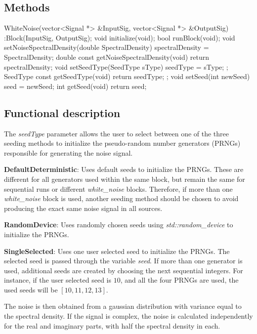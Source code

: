 \subsection*{Methods}

WhiteNoise(vector<Signal *> \&InputSig, vector<Signal *> \&OutputSig) :Block(InputSig, OutputSig){};
\bigbreak	
void initialize(void);
\bigbreak
bool runBlock(void);
\bigbreak
void setNoiseSpectralDensity(double SpectralDensity) { spectralDensity = SpectralDensity; }
\bigbreak
double const getNoiseSpectralDensity(void){ return spectralDensity; }
\bigbreak
void setSeedType(SeedType sType){ seedType = sType; };
\bigbreak
SeedType const getSeedType(void){ return seedType; };
\bigbreak
void setSeed(int newSeed) { seed = newSeed; }
\bigbreak
int getSeed(void){ return seed; }

\subsection*{Functional description}

The \textit{seedType} parameter allows the user to select between one of the three seeding methods to initialize the pseudo-random number generators (PRNGs) responsible for generating the noise signal.


\textbf{DefaultDeterministic}: Uses default seeds to initialize the PRNGs. These are different for all generators used within the same block, but remain the same for sequential runs or different \textit{white\_noise} blocks. Therefore, if more than one \textit{white\_noise} block is used, another seeding method should be chosen to avoid producing the exact same noise signal in all sources.

\textbf{RandomDevice}: Uses randomly chosen seeds using \textit{std::random\_device} to initialize the PRNGs.

\textbf{SingleSelected}: Uses one user selected seed to initialize the PRNGs. The selected seed is passed through the variable \textit{seed}. If more than one generator is used, additional seeds are created by choosing the next sequential integers. For instance, if the user selected seed is $10$, and all the four PRNGs are used, the used seeds will be $[10, 11, 12, 13]$.

The noise is then obtained from a gaussian distribution with variance equal to the spectral density. If the signal is complex, the noise is calculated independently for the real and imaginary parts, with half the spectral density in each.


